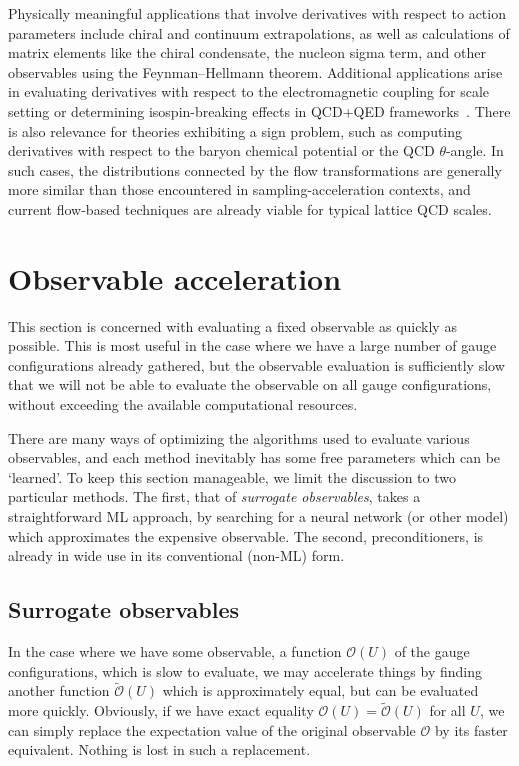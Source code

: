 \documentclass[12pt]{article}
\begin{document}
Physically meaningful applications that involve derivatives with respect to action parameters include chiral and continuum extrapolations, as well as calculations of matrix elements like the chiral condensate, the nucleon sigma term, and other observables using the Feynman--Hellmann theorem. Additional applications arise in evaluating derivatives with respect to the electromagnetic coupling for scale setting or determining isospin-breaking effects in QCD+QED frameworks~\cite{Hermansson-Truedsson:2026zlp}. There is also relevance for theories exhibiting a sign problem, such as computing derivatives with respect to the baryon chemical potential or the QCD $\theta$-angle. In such cases, the distributions connected by the flow transformations are generally more similar than those encountered in sampling-acceleration contexts, and current flow-based techniques are already viable for typical lattice QCD scales. 


\section{Observable acceleration}\label{sec:acceleration}

This section is concerned with evaluating a fixed observable as quickly as possible. This is most useful in the case where we have a large number of gauge configurations already gathered, but the observable evaluation is sufficiently slow that we will not be able to evaluate the observable on all gauge configurations, without exceeding the available computational resources.

There are many ways of optimizing the algorithms used to evaluate various observables, and each method inevitably has some free parameters which can be `learned'. To keep this section manageable, we limit the discussion to two particular methods. The first, that of \emph{surrogate observables}, takes a straightforward ML approach, by searching for a neural network (or other model) which approximates the expensive observable. The second, preconditioners, is already in wide use in its conventional (non-ML) form.


\subsection{Surrogate observables}

In the case where we have some observable, a function $\mathcal O(U)$ of the gauge configurations, which is slow to evaluate, we may accelerate things by finding another function $\tilde{\mathcal O}(U)$ which is approximately equal, but can be evaluated more quickly. Obviously, if we have exact equality $\mathcal O(U) = \tilde{\mathcal O}(U)$ for all $U$, we can simply replace the expectation value of the original observable $\mathcal O$ by its faster equivalent. Nothing is lost in such a replacement.
\end{document}
